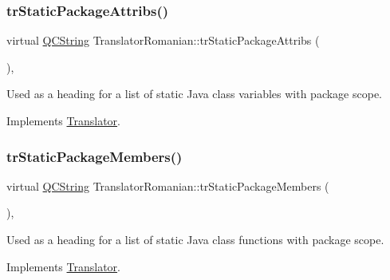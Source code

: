 \mbox{\label{class_translator_romanian_ace2dc362cc6fd8273dbfb203eb9c514d}} 
\subsubsection{\texorpdfstring{trStaticPackageAttribs()}{trStaticPackageAttribs()}}
{\footnotesize\ttfamily virtual \mbox{\hyperlink{class_q_c_string}{Q\+C\+String}} Translator\+Romanian\+::tr\+Static\+Package\+Attribs (\begin{DoxyParamCaption}{ }\end{DoxyParamCaption})\hspace{0.3cm}{\ttfamily [inline]}, {\ttfamily [virtual]}}

Used as a heading for a list of static Java class variables with package scope. 

Implements \mbox{\hyperlink{class_translator}{Translator}}.

\mbox{\label{class_translator_romanian_af1e3514911f946bb92e5c6782b422103}} 
\subsubsection{\texorpdfstring{trStaticPackageMembers()}{trStaticPackageMembers()}}
{\footnotesize\ttfamily virtual \mbox{\hyperlink{class_q_c_string}{Q\+C\+String}} Translator\+Romanian\+::tr\+Static\+Package\+Members (\begin{DoxyParamCaption}{ }\end{DoxyParamCaption})\hspace{0.3cm}{\ttfamily [inline]}, {\ttfamily [virtual]}}

Used as a heading for a list of static Java class functions with package scope. 

Implements \mbox{\hyperlink{class_translator}{Translator}}.

\mbox{\label{class_translator_romanian_a8bd66fc0016c5b8ababad71c51aece2b}} 
